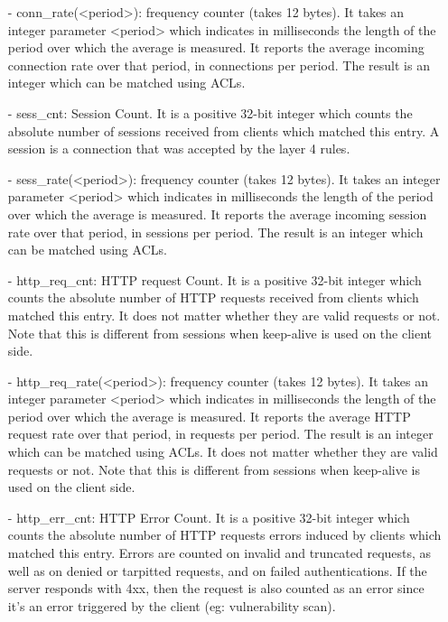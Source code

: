 \begin{description}
\begin{itemize}
  \item[-] conn\_rate(<period>): frequency counter (takes 12 bytes). It takes an
      integer parameter <period> which indicates in milliseconds the length
      of the period over which the average is measured. It reports the average
      incoming connection rate over that period, in connections per period. The
      result is an integer which can be matched using ACLs.

  \item[-] sess\_cnt: Session Count. It is a positive 32-bit integer which counts
      the absolute number of sessions received from clients which matched this
      entry. A session is a connection that was accepted by the layer 4 rules.

  \item[-] sess\_rate(<period>): frequency counter (takes 12 bytes). It takes an
      integer parameter <period> which indicates in milliseconds the length
      of the period over which the average is measured. It reports the average
      incoming session rate over that period, in sessions per period. The
      result is an integer which can be matched using ACLs.

  \item[-] http\_req\_cnt: HTTP request Count. It is a positive 32-bit integer which
      counts the absolute number of HTTP requests received from clients which
      matched this entry. It does not matter whether they are valid requests or
      not. Note that this is different from sessions when keep-alive is used on
      the client side.

  \item[-] http\_req\_rate(<period>): frequency counter (takes 12 bytes). It takes an
      integer parameter <period> which indicates in milliseconds the length
      of the period over which the average is measured. It reports the average
      HTTP request rate over that period, in requests per period. The result is
      an integer which can be matched using ACLs. It does not matter whether
      they are valid requests or not. Note that this is different from sessions
      when keep-alive is used on the client side.

  \item[-] http\_err\_cnt: HTTP Error Count. It is a positive 32-bit integer which
      counts the absolute number of HTTP requests errors induced by clients
      which matched this entry. Errors are counted on invalid and truncated
      requests, as well as on denied or tarpitted requests, and on failed
      authentications. If the server responds with 4xx, then the request is
      also counted as an error since it's an error triggered by the client
      (eg: vulnerability scan).


\end{itemize}
\end{description}
